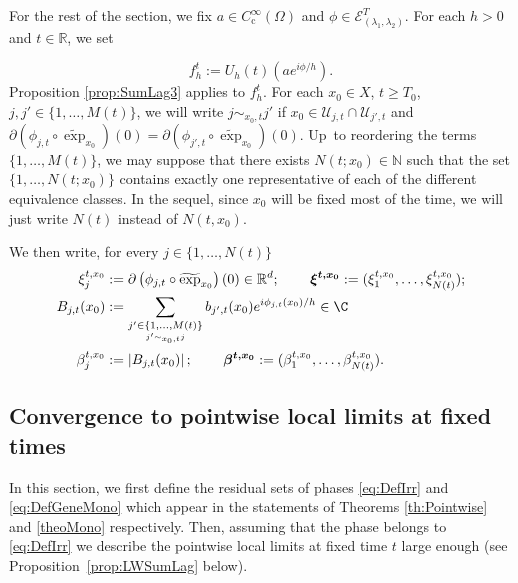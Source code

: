 \documentclass[10pt]{amsart}
\let\mathcal\mathscr
\newcommand{\rc}{\mathrm{c}}
\theoremstyle{plain}
\theoremstyle{definition}
\newcommand{\N}{\mathbb{N}}
\newcommand{\R}{\mathbb{R}}
\def\calE{\mathcal{E}}
\begin{document}
For the rest of the section, we fix $a\in C_\rc^\infty(\Omega)$ and $\phi\in\calE_{(\lambda_1,\lambda_2)}^T$. For each $h>0$ and $t\in\R$, we set

\[
f^t_h:= U_h(t) (a e^{i\phi/h}).
\]
Proposition \ref{prop:SumLag3} applies to $f^t_h$. For each $x_0\in X$, $t\geq T_0$, $j,j'\in \{1,\dots,M(t)\}$, we will write $j\sim_{x_0,t} j'$ if $x_0\in \mathcal{U}_{j,t}\cap \mathcal{U}_{j',t}$ and $\partial \left(\phi_{j,t}\circ \widetilde{\exp}_{x_0} \right)(0)= \partial \left(\phi_{j',t}\circ \widetilde{\exp}_{x_0} \right)(0)$. Up~to reordering the terms $\{1,\dots,M(t)\}$, we may suppose that there exists $N(t;x_0)\in \N$ such that the set $\{1,\dots,N(t;x_0)\}$ contains exactly one representative of each of the different equivalence classes. In the sequel, since $x_0$ will be fixed most of the time, we will just write $N(t)$ instead of $N(t,x_0)$.

We then write, for every $j\in \{1,\dots,N(t)\}$
\begin{equation}\label{eq:xi_beta}
\begin{aligned}
\xi^{t,x_0}_j &:= \partial \left(\phi_{j,t}\circ \widetilde{\exp}_{x_0} \right)(0)\in \mathbb{R}^{d};\, \qquad \boldsymbol{\xi^{t,x_0}}:=(\xi_1^{t,x_0},\dots,\xi_{N(t)}^{t,x_0}); \\
B_{j,t} (x_0) &:= \sum_{\underset{j'\sim_{x_0,t} j}{j'\in \{1,\dots,M(t)\}}} b_{j',t}(x_0) e^{i \phi_{j,t}(x_0)/h} \in \C\\
\beta^{t, x_0}_j&:= \left| B_{j,t} (x_0) \right| ;\, \qquad \boldsymbol{\beta^{t,x_0}}:=(\beta_1^{t,x_0},\dots,\beta_{N(t)}^{t,x_0}).
\end{aligned}
\end{equation}

\subsection{Convergence to pointwise local limits at fixed times}\label{ss:convergence}

In this section, we first define the residual sets of phases \eqref{eq:DefIrr} and \eqref{eq:DefGeneMono} which appear in the statements of Theorems \ref{th:Pointwise} and \ref{theoMono} respectively. Then, assuming that the phase belongs to \eqref{eq:DefIrr} we describe the pointwise local limits at fixed time $t$ large enough (see Proposition~\ref{prop:LWSumLag} below).
\end{document}
